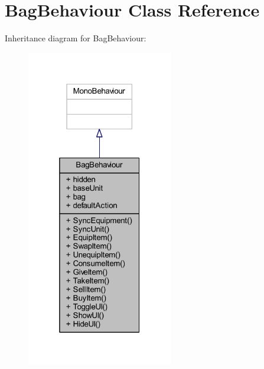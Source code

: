 \hypertarget{class_bag_behaviour}{}\section{Bag\+Behaviour Class Reference}
\label{class_bag_behaviour}


Inheritance diagram for Bag\+Behaviour\+:
\nopagebreak
\begin{figure}[H]
\begin{center}
\leavevmode
\includegraphics[width=181pt]{class_bag_behaviour__inherit__graph}
\end{center}
\end{figure}


